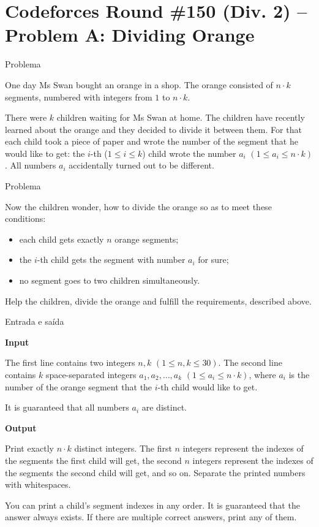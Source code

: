 \section{Codeforces Round \#150 (Div. 2) -- Problem A: Dividing Orange}

\begin{frame}[fragile]{Problema}

One day Ms Swan bought an orange in a shop. The orange consisted of $n\cdot k$ segments, numbered 
with integers from $1$ to $n\cdot k$.

There were $k$ children waiting for Ms Swan at home. The children have recently learned about the 
orange and they decided to divide it between them. For that each child took a piece of paper and 
wrote the number of the segment that he would like to get: the $i$-th ($1\leq i \leq k$) child 
wrote the number $a_i$ $(1\leq a_i \leq n\cdot k)$. All numbers $a_i$ accidentally turned out to be 
different.

\end{frame}

\begin{frame}[fragile]{Problema}

Now the children wonder, how to divide the orange so as to meet these conditions:

\begin{itemize}
    \item each child gets exactly $n$ orange segments;
    \item the $i$-th child gets the segment with number $a_i$ for sure;
    \item no segment goes to two children simultaneously.
\end{itemize}

Help the children, divide the orange and fulfill the requirements, described above.

\end{frame}

\begin{frame}[fragile]{Entrada e saída}

\textbf{Input}

The first line contains two integers $n, k$ $(1\leq n, k\leq 30)$. The second line contains 
$k$ space-separated integers $a_1, a_2, \ldots, a_k$ $(1\leq a_i\leq n\cdot k)$, where $a_i$ is 
the number of the orange segment that the $i$-th child would like to get.

It is guaranteed that all numbers $a_i$ are distinct.

\textbf{Output}

Print exactly $n\cdot k$ distinct integers. The first $n$ integers represent the indexes of the 
segments the first child will get, the second $n$ integers represent the indexes of the segments 
the second child will get, and so on. Separate the printed numbers with whitespaces.

You can print a child's segment indexes in any order. It is guaranteed that the answer always 
exists. If there are multiple correct answers, print any of them.

\end{frame}

